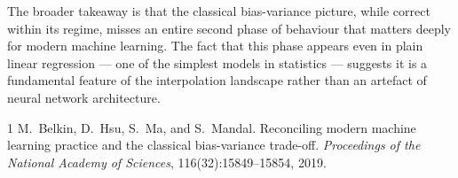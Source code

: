 \documentclass[11pt,a4paper]{article}
\begin{document}
The broader takeaway is that the classical bias-variance picture, while correct within its regime, misses an entire second phase of behaviour that matters deeply for modern machine learning. The fact that this phase appears even in plain linear regression --- one of the simplest models in statistics --- suggests it is a fundamental feature of the interpolation landscape rather than an artefact of neural network architecture.

\begin{thebibliography}{1}
M.\ Belkin, D.\ Hsu, S.\ Ma, and S.\ Mandal.
\newblock Reconciling modern machine learning practice and the classical bias-variance trade-off.
\newblock \textit{Proceedings of the National Academy of Sciences}, 116(32):15849--15854, 2019.
\end{thebibliography}
\end{document}
